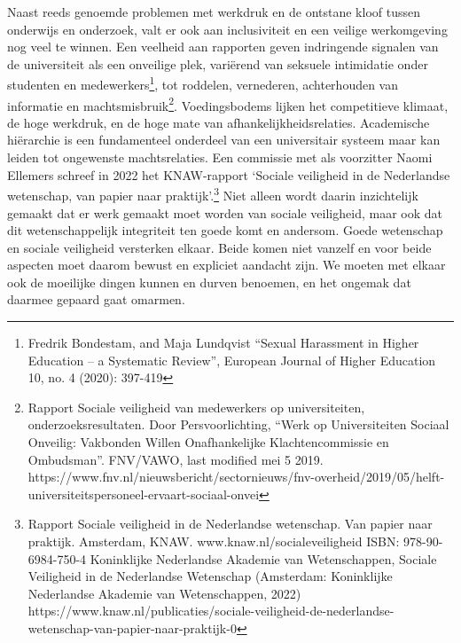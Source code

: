 \documentclass[empirical, authordate, ]{new-jote-article}
\begin{document}
	Naast reeds genoemde problemen met werkdruk en de ontstane kloof tussen onderwijs en onderzoek, valt er ook aan inclusiviteit en een veilige werkomgeving nog veel te winnen. Een veelheid aan rapporten geven indringende signalen van de universiteit als een onveilige plek, variërend van seksuele intimidatie onder studenten en medewerkers\footnote{Fredrik Bondestam, and Maja Lundqvist “Sexual Harassment in Higher Education -- a Systematic Review”, European Journal of Higher Education 10, no. 4 (2020): 397-419}, tot roddelen, vernederen, achterhouden van informatie en machtsmisbruik\footnote{Rapport Sociale veiligheid van medewerkers op universiteiten, onderzoeksresultaten. Door Persvoorlichting, “Werk op Universiteiten Sociaal Onveilig: Vakbonden Willen Onafhankelijke Klachtencommissie en Ombudsman”. FNV/VAWO, last modified mei 5 2019. https://www.fnv.nl/nieuwsbericht/sectornieuws/fnv-overheid/2019/05/helft-universiteitspersoneel-ervaart-sociaal-onvei}. Voedingsbodems lijken het competitieve klimaat, de hoge werkdruk, en de hoge mate van afhankelijkheidsrelaties. Academische hiërarchie is een fundamenteel onderdeel van een universitair systeem maar kan leiden tot ongewenste machtsrelaties. Een commissie met als voorzitter Naomi Ellemers schreef in 2022 het KNAW-rapport ‘Sociale veiligheid in de Nederlandse wetenschap, van papier naar praktijk'.\footnote{Rapport Sociale veiligheid in de Nederlandse wetenschap. Van papier naar praktijk. Amsterdam, KNAW. www.knaw.nl/socialeveiligheid ISBN: 978-90-6984-750-4 Koninklijke Nederlandse Akademie van Wetenschappen, Sociale Veiligheid in de Nederlandse Wetenschap (Amsterdam: Koninklijke Nederlandse Akademie van Wetenschappen, 2022) https://www.knaw.nl/publicaties/sociale-veiligheid-de-nederlandse-wetenschap-van-papier-naar-praktijk-0} Niet alleen wordt daarin inzichtelijk gemaakt dat er werk gemaakt moet worden van sociale veiligheid, maar ook dat dit wetenschappelijk integriteit ten goede komt en andersom. Goede wetenschap en sociale veiligheid versterken elkaar. Beide komen niet vanzelf en voor beide aspecten moet daarom bewust en expliciet aandacht zijn. We moeten met elkaar ook de moeilijke dingen kunnen en durven benoemen, en het ongemak dat daarmee gepaard gaat omarmen.
\end{document}
